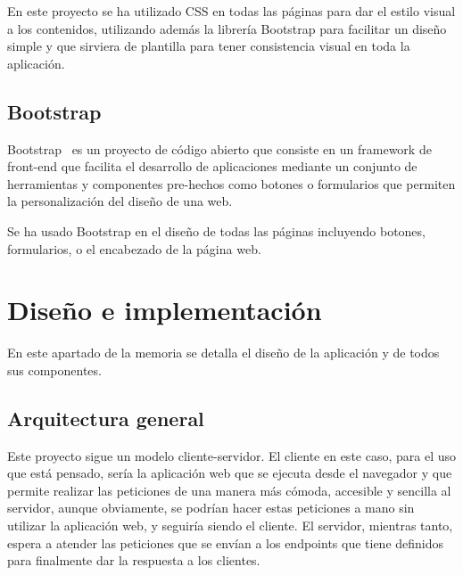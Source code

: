 \documentclass[a4paper, 12pt]{book}
\begin{document}
En este proyecto se ha utilizado CSS en todas las páginas para dar el estilo visual a los contenidos, utilizando además la librería Bootstrap para facilitar un diseño simple y que sirviera de plantilla para tener consistencia visual en toda la aplicación.

\section{Bootstrap}
\label{sec:Bootstrap}

Bootstrap~\cite{bootstrap:_bootstrap} es un proyecto de código abierto que consiste en un framework de front-end que facilita el desarrollo de aplicaciones mediante un conjunto de herramientas y componentes pre-hechos como botones o formularios que permiten la personalización del diseño de una web.

Se ha usado Bootstrap en el diseño de todas las páginas incluyendo botones, formularios, o el encabezado de la página web.



\cleardoublepage
\chapter{Diseño e implementación}
\label{sec:diseno}

En este apartado de la memoria se detalla el diseño de la aplicación y de todos sus componentes.

\section{Arquitectura general}
\label{sec:arquitectura}

Este proyecto sigue un modelo cliente-servidor. El cliente en este caso, para el uso que está pensado, sería la aplicación web que se ejecuta desde el navegador y que permite realizar las peticiones de una manera más cómoda, accesible y sencilla al servidor, aunque obviamente, se podrían hacer estas peticiones a mano sin utilizar la aplicación web, y seguiría siendo el cliente. El servidor, mientras tanto, espera a atender las peticiones que se envían a los endpoints que tiene definidos para finalmente dar la respuesta a los clientes.
\end{document}
